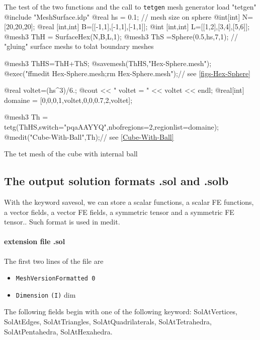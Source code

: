 \documentclass[a4paper,twoside,12pt]{book}
\begin{document}
\eFF

The test of the two functions and the call to \texttt{tetgen} mesh generator
\bFF
 load "tetgen"
 @include "MeshSurface.idp"
    @real hs = 0.1;  // mesh size on sphere
    @int[int]  N=[20,20,20];
    @real [int,int]  B=[[-1,1],[-1,1],[-1,1]];
    @int [int,int]  L=[[1,2],[3,4],[5,6]];
    @mesh3 ThH = SurfaceHex(N,B,L,1);
    @mesh3 ThS =Sphere(0.5,hs,7,1); // "gluing" surface meshs to tolat boundary meshes

    @mesh3 ThHS=ThH+ThS;
    @savemesh(ThHS,"Hex-Sphere.mesh");
    @exec("ffmedit Hex-Sphere.mesh;rm Hex-Sphere.mesh");// see \ref{figs-Hex-Sphere}

    @real voltet=(hs^3)/6.;
    @cout << " voltet = " << voltet << endl;
    @real[int] domaine = [0,0,0,1,voltet,0,0,0.7,2,voltet];

    @mesh3 Th = tetg(ThHS,switch="pqaAAYYQ",nbofregions=2,regionlist=domaine);
    @medit("Cube-With-Ball",Th);// see \ref{Cube-With-Ball}

\eFF
{}
{The tet mesh of the cube with internal ball\label{figs-Cube-With-Ball}}

\subsection{The output solution formats .sol and .solb}
With the keyword savesol, we can store a scalar functions, a scalar FE functions,
a vector fields, a vector FE fields, a symmetric tensor and a symmetric FE tensor..
Such format is used in medit.

\paragraph{extension file .sol}
\def\Int#1{ {\tt(I)} #1}
\def\Loop#1#2{{\bf\Large(}\,#1\,{\bf\Large{,\,\,}}\,#2\,{\bf\Large)}}

The first two lines of the file are
\small
\begin{itemize}
\item {\tt MeshVersionFormatted 0}
\end{itemize}
\normalsize

\small
\begin{itemize}
\item {\tt Dimension}
  \Int{dim}
\end{itemize}

The following fields begin with one of the following keyword:
SolAtVertices, SolAtEdges, SolAtTriangles, SolAtQuadrilaterals,
SolAtTetrahedra, SolAtPentahedra, SolAtHexahedra.
\end{document}
